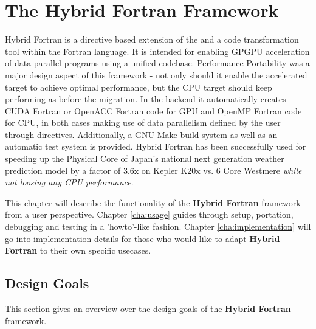 \chapter{The Hybrid Fortran Framework} \label{cha:framework}
Hybrid Fortran is a directive based extension of the and a code transformation tool within the Fortran language. It is intended for enabling GPGPU acceleration of data parallel programs using a unified codebase. Performance Portability was a major design aspect of this framework - not only should it enable the accelerated target to achieve optimal performance, but the CPU target should keep performing as before the migration. In the backend it automatically creates CUDA Fortran or OpenACC Fortran code for GPU and OpenMP Fortran code for CPU, in both cases making use of data parallelism defined by the user through directives. Additionally, a GNU Make build system as well as an automatic test system is provided. Hybrid Fortran has been successfully used for speeding up the Physical Core of Japan's national next generation weather prediction model by a factor of 3.6x on Kepler K20x vs. 6 Core Westmere \textit{while not loosing any CPU performance}.

This chapter will describe the functionality of the \textbf{Hybrid Fortran} framework from a user perspective. Chapter \ref{cha:usage} guides through setup, portation, debugging and testing in a 'howto'-like fashion. Chapter \ref{cha:implementation} will go into implementation details for those who would like to adapt \textbf{Hybrid Fortran} to their own specific usecases.

\section{Design Goals} \label{sec:frameworkGoals}

This section gives an overview over the design goals of the \textbf{Hybrid Fortran} framework.

